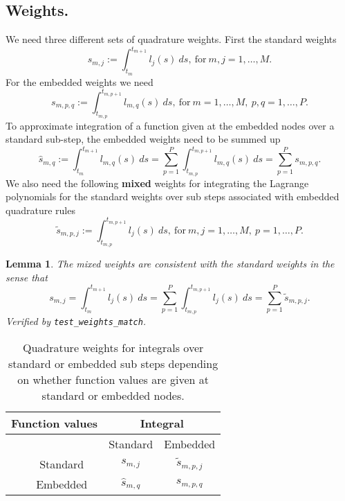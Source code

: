 \documentclass{article}
\newtheorem{lemma}{Lemma}
\begin{document}
\subsection*{Weights.}
We need three different sets of quadrature weights.
First the standard weights
\begin{equation}
	s_{m,j} := \int_{t_{m}}^{t_{m+1}} l_{j}(s)~ds, \ \text{for} \ m,j=1,\ldots,M.
\end{equation}
For the embedded weights we need
\begin{equation}
	s_{m,p,q} := \int_{t_{m,p}}^{t_{m,p+1}} l_{m,q}(s)~ds, \ \text{for} \ m=1,\ldots,M, \ p,q=1,\ldots,P.
\end{equation}
To approximate integration of a function given at the embedded nodes over a standard sub-step, the embedded weights need to be summed up
\begin{equation}
	\hat{s}_{m,q} := \int_{t_{m}}^{t_{m+1}} l_{m,q}(s)~ds = \sum_{p=1}^{P} \int_{t_{m,p}}^{t_{m,p+1}} l_{m,q}(s)~ds = \sum_{p=1}^{P} s_{m,p,q}.
\end{equation}
We also need the following \textbf{mixed} weights for integrating the Lagrange polynomials for the standard weights over sub steps associated with embedded quadrature rules
\begin{equation}
	\tilde{s}_{m,p,j} := \int_{t_{m,p}}^{t_{m,p+1}} l_{j}(s)~ds, \ \text{for} \ m,j=1,\ldots,M, \ p=1,\ldots,P.
\end{equation}
\begin{lemma}\label{lemma:weights_match}
The mixed weights are consistent with the standard weights in the sense that
\begin{equation}
	s_{m,j} = \int_{t_m}^{t_{m+1}} l_j(s)~ds = \sum_{p=1}^{P} \int_{t_{m,p}}^{t_{m,p+1}} l_j(s)~ds = \sum_{p=1}^{P} \tilde{s}_{m,p,j}.
\end{equation}
Verified by \texttt{test\_weights\_match}.
\end{lemma}

\begin{table}[h]
\centering
\begin{tabular}{|cc|cc|} \hline
\multicolumn{2}{|c|}{Function values} & \multicolumn{2}{c|}{Integral} \\ \hline
&          & Standard        & Embedded            \\ \hline
& Standard & $s_{m,j}$       & $\tilde{s}_{m,p,j}$ \\
& Embedded & $\hat{s}_{m,q}$ & $s_{m,p,q}$ \\ \hline
\end{tabular}
\caption{Quadrature weights for integrals over standard or embedded sub steps depending on whether function values are given at standard or embedded nodes.}
\end{table}
\end{document}
